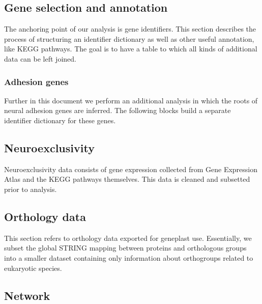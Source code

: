 \documentclass[
]{article}
\begin{document}
\hypertarget{gene-selection-and-annotation}{%
\subsection{Gene selection and
annotation}\label{gene-selection-and-annotation}}

The anchoring point of our analysis is gene identifiers. This section
describes the process of structuring an identifier dictionary as well as
other useful annotation, like KEGG pathways. The goal is to have a table
to which all kinds of additional data can be left joined.


\hypertarget{adhesion-genes}{%
\subsubsection{Adhesion genes}\label{adhesion-genes}}

Further in this document we perform an additional analysis in which the
roots of neural adhesion genes are inferred. The following blocks build
a separate identifier dictionary for these genes.


\hypertarget{neuroexclusivity}{%
\subsection{Neuroexclusivity}\label{neuroexclusivity}}

Neuroexclusivity data consists of gene expression collected from Gene
Expression Atlas and the KEGG pathways themselves. This data is cleaned
and subsetted prior to analysis. 

\hypertarget{orthology-data}{%
\subsection{Orthology data}\label{orthology-data}}

This section refers to orthology data exported for geneplast use.
Essentially, we subset the global STRING mapping between proteins and
orthologous groups into a smaller dataset containing only information
about orthogroups related to eukaryotic species.


\hypertarget{network}{%
\subsection{Network}\label{network}}
\end{document}

